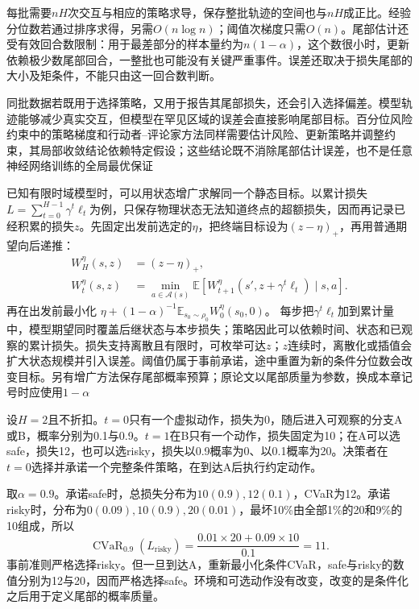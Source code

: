 每批需要$nH$次交互与相应的策略求导，保存整批轨迹的空间也与$nH$成正比。经验分位数若通过排序求得，另需$O(n\log n)$；阈值次梯度只需$O(n)$。尾部估计还受有效回合数限制：用于最差部分的样本量约为$n(1-\alpha)$，这个数很小时，更新依赖极少数尾部回合，一整批也可能没有关键严重事件。误差还取决于损失尾部的大小及矩条件，不能只由这一回合数判断。

同批数据若既用于选择策略，又用于报告其尾部损失，还会引入选择偏差。模型轨迹能够减少真实交互，但模型在罕见区域的误差会直接影响尾部目标。百分位风险约束中的策略梯度和行动者--评论家方法同样需要估计风险、更新策略并调整约束，其局部收敛结论依赖特定假设；这些结论既不消除尾部估计误差，也不是任意神经网络训练的全局最优保证

已知有限时域模型时，可以用状态增广求解同一个静态目标。以累计损失
$L=\sum_{t=0}^{H-1}\gamma^t\ell_t$为例，只保存物理状态无法知道终点的超额损失，因而再记录已经积累的损失$z$。先固定出发前选定的$\eta$，把终端目标设为$(z-\eta)_+$，再用普通期望向后递推：
\begin{align}
  W_H^\eta(s,z)&=(z-\eta)_+, \nonumber\\
  W_t^\eta(s,z)&=\min_{a\in\mathcal A(s)}
       \mathbb E\!\left[
       W_{t+1}^\eta(s',z+\gamma^t\ell_t)\mid s,a\right].
  \label{eq:rl-trustworthy-augmented-risk}
\end{align}
再在出发前最小化
$\eta+(1-\alpha)^{-1}\mathbb E_{s_0\sim\rho_0}W_0^\eta(s_0,0)$。
每步把$\gamma^t\ell_t$加到累计量中，模型期望同时覆盖后继状态与本步损失；策略因此可以依赖时间、状态和已观察的累计损失。损失支持离散且有限时，可枚举可达$z$；$z$连续时，离散化或插值会扩大状态规模并引入误差。阈值仍属于事前承诺，途中重置为新的条件分位数会改变目标。另有增广方法保存尾部概率预算；原论文以尾部质量为参数，换成本章记号时应使用$1-\alpha$

\begin{example}[静态CVaR的时间不一致]
  \label{ex:rl-trustworthy-time-inconsistency}
  设$H=2$且不折扣。$t=0$只有一个虚拟动作，损失为0，随后进入可观察的分支A或B，概率分别为0.1与0.9。$t=1$在B只有一个动作，损失固定为10；在A可以选safe，损失12，也可以选risky，损失以0.9概率为0、以0.1概率为20。决策者在$t=0$选择并承诺一个完整条件策略，在到达A后执行约定动作。

  取$\alpha=0.9$。承诺safe时，总损失分布为$10(0.9),12(0.1)$，CVaR为12。承诺risky时，分布为$0(0.09),10(0.9),20(0.01)$，最坏10\%由全部1\%的20和9\%的10组成，所以
  \[
    \operatorname{CVaR}_{0.9}(L_{\text{risky}})
       =\frac{0.01\times20+0.09\times10}{0.1}=11.
  \]
  事前准则严格选择risky。但一旦到达A，重新最小化条件CVaR，safe与risky的数值分别为12与20，因而严格选择safe。环境和可选动作没有改变，改变的是条件化之后用于定义尾部的概率质量。
\end{example}

